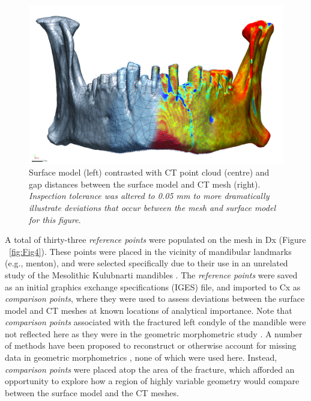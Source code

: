 \documentclass[review]{elsarticle}
\begin{document}
\begin{figure}[ht]\centering
\includegraphics[width=\linewidth]{Fig2}
\caption{Surface model (left) contrasted with CT point cloud (centre) and gap distances between the surface model and CT mesh (right). \textit{Inspection tolerance was altered to 0.05 mm to more dramatically illustrate deviations that occur between the mesh and surface model for this figure}.}
\label{fig:Fig1x}
\end{figure}

A total of thirty-three \textit{reference points} were populated on the mesh in Dx (Figure ~\ref{fig:Fig4}). These points were placed in the vicinity of mandibular landmarks (e.g., menton), and were selected specifically due to their use in an unrelated study of the Mesolithic Kulubnarti mandibles \citep{RN11477}. The \textit{reference points} were saved as an initial graphics exchange specifications (IGES) file, and imported to Cx as \textit{comparison points}, where they were used to assess deviations between the surface model and CT meshes at known locations of analytical importance. Note that \textit{comparison points} associated with the fractured left condyle of the mandible were not reflected here as they were in the geometric morphometric study \citep{RN11477}. A number of methods have been proposed to reconstruct \citep{RN11496,RN11501} or otherwise account for missing data in geometric morphometrics \citep{RN11500,RN11497,RN11498,RN11499,RN5928}, none of which were used here. Instead, \textit{comparison points} were placed atop the area of the fracture, which afforded an opportunity to explore how a region of highly variable geometry would compare between the surface model and the CT meshes.
\end{document}
